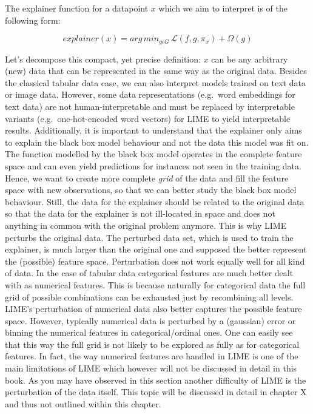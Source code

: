 \documentclass[]{krantz}
\begin{document}
The explainer function for a datapoint \(x\) which we aim to interpret
is of the following form:

\begin{equation}
  explainer\left(x\right) = arg\,min_{g \epsilon G} \,\mathcal{L}\left(f, g, \pi_x \right) + \Omega\left(g\right)
\end{equation}

Let's decompose this compact, yet precise definition: \(x\) can be any
arbitrary (new) data that can be represented in the same way as the
original data. Besides the classical tabular data case, we can also
interpret models trained on text data or image data. However, some data
representations (e.g.~word embeddings for text data) are not
human-interpretable and must be replaced by interpretable variants
(e.g.~one-hot-encoded word vectors) for LIME to yield interpretable
results. Additionally, it is important to understand that the explainer
only aims to explain the black box model behaviour and not the data this
model was fit on. The function modelled by the black box model operates
in the complete feature space and can even yield predictions for
instances not seen in the training data. Hence, we want to create more
complete \emph{grid} of the data and fill the feature space with new
observations, so that we can better study the black box model behaviour.
Still, the data for the explainer should be related to the original data
so that the data for the explainer is not ill-located in space and does
not anything in common with the original problem anymore. This is why
LIME perturbs the original data. The perturbed data set, which is used
to train the explainer, is much larger than the original one and
supposed the better represent the (possible) feature space. Perturbation
does not work equally well for all kind of data. In the case of tabular
data categorical features are much better dealt with as numerical
features. This is because naturally for categorical data the full grid
of possible combinations can be exhausted just by recombining all
levels. LIME's perturbation of numerical data also better captures the
possible feature space. However, typically numerical data is perturbed
by a (gaussian) error or binning the numerical features in
categorical/ordinal ones. One can easily see that this way the full grid
is not likely to be explored as fully as for categorical features. In
fact, the way numerical features are handled in LIME is one of the main
limitations of LIME which however will not be discussed in detail in
this book. As you may have observed in this section another difficulty
of LIME is the perturbation of the data itself. This topic will be
discussed in detail in chapter X and thus not outlined within this
chapter.
\end{document}
